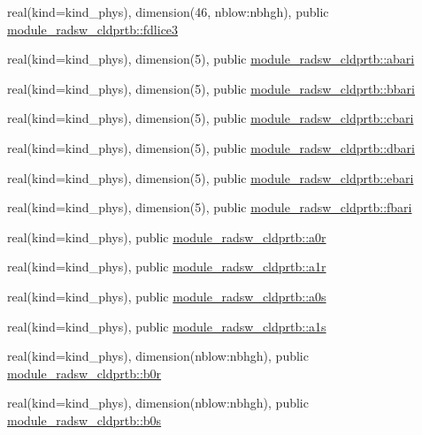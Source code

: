 \begin{DoxyCompactItemize}
\item 
real(kind=kind\+\_\+phys), dimension(46, nblow\+:nbhgh), public \hyperlink{group__module__radsw__main_gaa42cf6596d2dcd887864b1de40da3293}{module\+\_\+radsw\+\_\+cldprtb\+::fdlice3}
\item 
real(kind=kind\+\_\+phys), dimension(5), public \hyperlink{group__module__radsw__main_gace960bbbf15ab3cadbee76301ff111dd}{module\+\_\+radsw\+\_\+cldprtb\+::abari}
\item 
real(kind=kind\+\_\+phys), dimension(5), public \hyperlink{group__module__radsw__main_gad5342321ccd4759cb70f7a673620ee19}{module\+\_\+radsw\+\_\+cldprtb\+::bbari}
\item 
real(kind=kind\+\_\+phys), dimension(5), public \hyperlink{group__module__radsw__main_gae7f1de5c9736894ac7b54c0e0d312f16}{module\+\_\+radsw\+\_\+cldprtb\+::cbari}
\item 
real(kind=kind\+\_\+phys), dimension(5), public \hyperlink{group__module__radsw__main_gaf8b02590603ea2f838d954cb0a93bbeb}{module\+\_\+radsw\+\_\+cldprtb\+::dbari}
\item 
real(kind=kind\+\_\+phys), dimension(5), public \hyperlink{group__module__radsw__main_ga3cc7ab844ca564bd3df02a687bbc2f43}{module\+\_\+radsw\+\_\+cldprtb\+::ebari}
\item 
real(kind=kind\+\_\+phys), dimension(5), public \hyperlink{group__module__radsw__main_gac2e5b61aea6effe7d49586bf5223c154}{module\+\_\+radsw\+\_\+cldprtb\+::fbari}
\item 
real(kind=kind\+\_\+phys), public \hyperlink{group__module__radsw__main_ga0fdb9425031a10735e11d7f5c9e0376e}{module\+\_\+radsw\+\_\+cldprtb\+::a0r}
\item 
real(kind=kind\+\_\+phys), public \hyperlink{group__module__radsw__main_ga9826a0616c434620200ce4652b5af800}{module\+\_\+radsw\+\_\+cldprtb\+::a1r}
\item 
real(kind=kind\+\_\+phys), public \hyperlink{group__module__radsw__main_ga81ba576e28e5844772d040ff7543faae}{module\+\_\+radsw\+\_\+cldprtb\+::a0s}
\item 
real(kind=kind\+\_\+phys), public \hyperlink{group__module__radsw__main_ga9bf8de06b96c5014ca7f21fd39d84257}{module\+\_\+radsw\+\_\+cldprtb\+::a1s}
\item 
real(kind=kind\+\_\+phys), dimension(nblow\+:nbhgh), public \hyperlink{group__module__radsw__main_gac39d49e73ffa960421e36e45a35db162}{module\+\_\+radsw\+\_\+cldprtb\+::b0r}
\item 
real(kind=kind\+\_\+phys), dimension(nblow\+:nbhgh), public \hyperlink{group__module__radsw__main_ga391fbdda62f6fba95e105c2041e16880}{module\+\_\+radsw\+\_\+cldprtb\+::b0s}

\end{DoxyCompactItemize}
